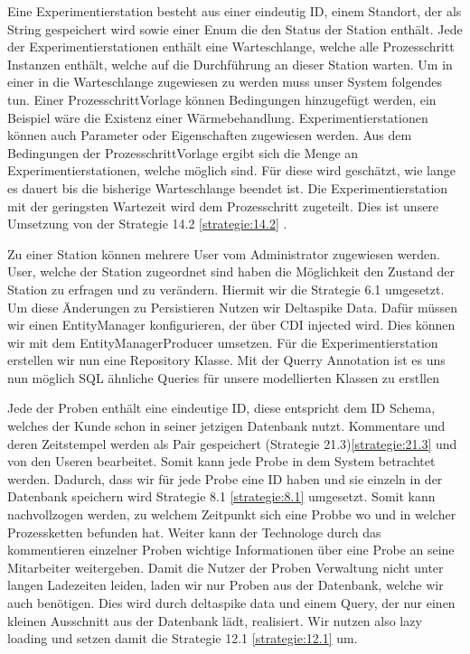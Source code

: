 \documentclass[enabledeprecatedfontcommands,fontsize=12pt,paper=a4,twoside]{scrartcl}
\begin{document}
{Eine Experimentierstation besteht aus einer eindeutig ID, einem Standort, der
als String gespeichert wird sowie einer Enum die den Status der Station
enthält. Jede der Experimentierstationen enthält eine Warteschlange, welche alle
Prozesschritt Instanzen enthält, welche auf die Durchführung an dieser Station
warten. Um in einer in die Warteschlange zugewiesen zu werden muss unser System
folgendes tun. Einer ProzesschrittVorlage können Bedingungen hinzugefügt werden,
ein Beispiel wäre die Existenz einer Wärmebehandlung. Experimentierstationen
können auch Parameter oder Eigenschaften zugewiesen werden.
Aus dem Bedingungen der ProzesschrittVorlage ergibt sich die Menge an
Experimentierstationen, welche möglich sind. Für diese wird geschätzt, wie lange
es dauert bis die bisherige Warteschlange beendet ist. Die Experimentierstation
mit der geringsten Wartezeit wird dem Prozesschritt zugeteilt. Dies ist unsere
Umsetzung von der Strategie 14.2 \ref{strategie:14.2} .

Zu einer Station können mehrere User vom Administrator zugewiesen
werden. User, welche der Station zugeordnet sind haben die Möglichkeit den
Zustand der Station zu erfragen und zu verändern. Hiermit wir die Strategie 6.1
umgesetzt. Um diese Änderungen zu Persistieren Nutzen wir Deltaspike Data. Dafür
müssen wir einen EntityManager konfigurieren, der über CDI injected wird. Dies
können wir mit dem EntityManagerProducer umsetzen. Für die Experimentierstation
erstellen wir nun eine Repository Klasse. Mit der Querry Annotation ist es uns
nun möglich SQL ähnliche Queries für unsere modellierten Klassen zu erstllen

Jede der Proben enthält eine eindeutige ID, diese entspricht dem ID Schema,
welches der Kunde schon in seiner jetzigen Datenbank nutzt. Kommentare und deren
Zeitstempel werden als Pair gespeichert (Strategie 21.3)\ref{strategie:21.3}  und von den
Useren bearbeitet. Somit kann jede Probe in dem System betrachtet werden.
Dadurch, dass wir für jede Probe eine ID haben und sie einzeln in der Datenbank
speichern wird Strategie 8.1 \ref{strategie:8.1} umgesetzt. Somit kann nachvollzogen werden, zu
welchem Zeitpunkt sich eine Probbe wo und in welcher Prozessketten befunden hat.
Weiter kann der Technologe durch das kommentieren einzelner Proben wichtige
Informationen über eine Probe an seine Mitarbeiter weitergeben. Damit die Nutzer
der Proben Verwaltung nicht unter langen Ladezeiten leiden, laden wir nur Proben
aus der Datenbank, welche wir auch benötigen. Dies wird durch deltaspike data
und einem Query, der nur einen kleinen Ausschnitt aus der Datenbank lädt,
realisiert. Wir nutzen also lazy loading und setzen damit die Strategie 12.1 \ref{strategie:12.1} um.

}
\end{document}
